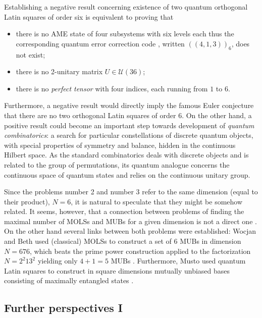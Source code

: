 \documentclass[english,aps,pra,nofootinbib,twocolumn,superscriptaddress]{revtex4-1}
\newcommand{\1}{{\rm 1\hspace{-0.9mm}l}}
\begin{document}
Establishing a negative result concerning existence of
two  quantum orthogonal Latin squares of order six is equivalent to
proving that 
\begin{itemize}

\item[i)] there is no AME state
       of four subsystems with six levels each \cite{HCLRL12,HESG18}
   thus the corresponding quantum error correction code  \cite{GBR04},
written  $((4,1,3))_6$, does not exist;
    \item[ii)]  there is no 2-unitary matrix $U \in \mathcal{U}(36)$;
       \item[iii)] there is no {\sl perfect tensor}
        with four indices, each running from $1$ to $6$. 
\end{itemize}


Furthermore, a negative result would directly imply the famous
    Euler conjecture that there are no two orthogonal Latin squares of order $6$.
    On the other hand, a positive result
    could become an important step towards development of {\sl quantum combinatorics}:
     a search for particular constellations of discrete quantum objects, 
     with special properties of symmetry and balance,
       hidden in the continuous Hilbert space. 
      As the standard combinatorics deals with discrete objects 
      and is related to the group of permutations,
      its quantum analogue concerns the continuous space of quantum states
      and relies on the continuous unitary group.
      
      Since  the problems number 2 and number 3 refer to the  same dimension
       (equal to their product), $N=6$,
        it is natural to speculate that they might be somehow related.
        It seems, however, that a  connection between
        problems of finding the maximal number of MOLSs
        and MUBs for a given dimension is not a direct one \cite{PDB09,PPGB10}.
        On the other hand several links between both problems were established: 
        Wocjan and Beth used (classical) MOLSs to construct a set of $6$ MUBs in dimension 
         $N=676$, which beats the prime power construction
          applied to the factorization $N=2^2 13^2$ yielding
            only $4+1=5$ MUBs \cite{WB05}.
            Furthermore,  Musto  used quantum Latin squares
            to construct in square dimensions mutually unbiased bases 
            consisting of maximally entangled states  \cite{Mu16}.
            

   
\subsection{Further perspectives I}
\end{document}
